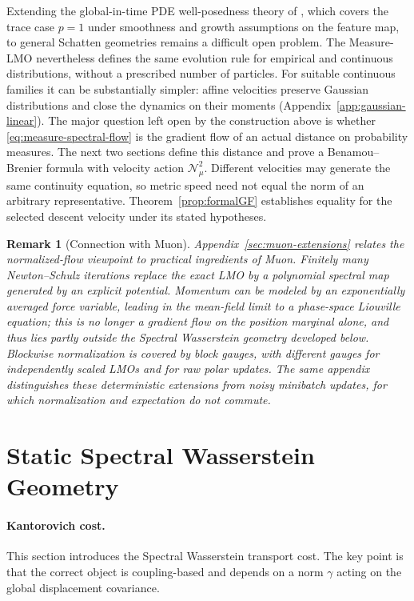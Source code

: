 \documentclass{article}
\newtheorem{remark}[theorem]{Remark}
\newcommand{\MN}{\mathcal{N}}
\begin{document}
Extending the global-in-time PDE well-posedness theory of
\citet{ChizatBach2018}, which covers the trace case $p=1$ under smoothness and
growth assumptions on the feature map, to general Schatten geometries remains
a difficult open problem.
The Measure-LMO nevertheless defines the same evolution rule for empirical
and continuous distributions, without a prescribed number of particles.
For suitable continuous families it can be substantially simpler: affine
velocities preserve Gaussian distributions and close the dynamics on their
moments (Appendix~\ref{app:gaussian-linear}).
%
The major question left open by the construction above is whether
\eqref{eq:measure-spectral-flow} is the gradient flow of an actual distance
on probability measures. The next two sections define this distance and
prove a Benamou--Brenier formula with velocity action $\MN_\mu^2$.
Different velocities may generate the same continuity equation, so metric
speed need not equal the norm of an arbitrary representative.
Theorem~\ref{prop:formalGF} establishes equality for the selected descent
velocity under its stated hypotheses.


\begin{remark}[Connection with Muon]
Appendix~\ref{sec:muon-extensions} relates the normalized-flow viewpoint to
practical ingredients of Muon. Finitely many Newton--Schulz iterations replace
the exact LMO by a polynomial spectral map generated by an explicit
potential. Momentum can be modeled by an exponentially averaged force
variable, leading in the mean-field limit to a phase-space Liouville equation;
this is no longer a gradient flow on the position marginal alone, and thus lies
partly outside the Spectral Wasserstein geometry developed below.
Blockwise normalization is covered by block gauges, with different gauges
for independently scaled LMOs and for raw polar updates.
The same appendix distinguishes these deterministic extensions from noisy
minibatch updates, for which normalization and expectation do not commute.
\end{remark}


\section{Static Spectral Wasserstein Geometry}
\label{sec:static}

\paragraph{Kantorovich cost.}
This section introduces the Spectral Wasserstein transport cost. The key point is that the correct object is coupling-based and depends on a norm $\gamma$ acting on the global displacement covariance.
\end{document}
